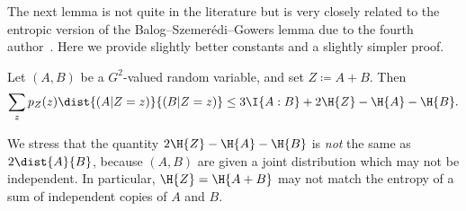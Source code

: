 The next lemma is not quite in the literature but is very closely related to the entropic version of the Balog--Szemer\'edi--Gowers lemma due to the fourth author~\cite[Lemma 3.3]{tao-entropy}. Here we provide slightly better constants and a slightly simpler proof.
\begin{lemma}\label{lem-bsg}
  Let $(A,B)$ be a $G^2$-valued random variable, and set $Z \coloneqq A+B$.
Then
\begin{equation}\label{2-bsg-takeaway} \sum_{z} p_Z(z) \dist{(A | Z = z)}{(B | Z = z)} \leq 3\I{A:B} + 2 \H{Z} - \H{A} - \H{B}. \end{equation}
\end{lemma}
We stress that the quantity $2 \H{Z} - \H{A} - \H{B}$ is \emph{not} the same as $2\dist{A}{B}$, because $(A,B)$ are given a joint distribution which may not be independent. In particular, $\H{Z}=\H{A+B}$ may not match the entropy of a sum of independent copies of $A$ and $B$.
